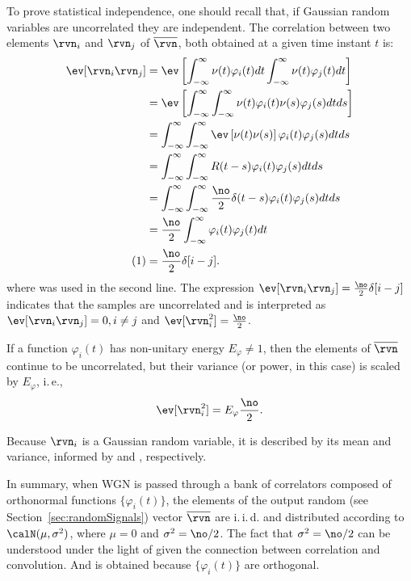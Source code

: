 To prove statistical independence, one should recall that, if Gaussian random variables are uncorrelated they are independent. The correlation between two elements $\rvn_i$ and $\rvn_j$ of $\overline \rvn$, both obtained at a given time instant $t$ is:
\begin{align*}
\ev[\rvn_i \rvn_j] &= \ev \left[ \int_{-\infty}^{\infty}{\nu(t)\varphi_i(t) dt} \int_{-\infty}^{\infty}{\nu(t)\varphi_j(t) dt} \right] \\
 &= \ev \left[ \int_{-\infty}^{\infty}\int_{-\infty}^{\infty}{\nu(t)\varphi_i(t) \nu(s)\varphi_j(s) dt ds} \right] \\
 &= \int_{-\infty}^{\infty}\int_{-\infty}^{\infty} { \ev \left[ \nu(t) \nu(s) \right] \varphi_i(t) \varphi_j(s) dt ds} \\
 &= \int_{-\infty}^{\infty}\int_{-\infty}^{\infty} { R(t-s)  \varphi_i(t) \varphi_j(s) dt ds} \\
 &=  \int_{-\infty}^{\infty}\int_{-\infty}^{\infty} { \frac{\no}{2} \delta(t-s) \varphi_i(t) \varphi_j(s) dt ds} \\
 &=   \frac{\no}{2} \int_{-\infty}^{\infty} {  \varphi_i(t) \varphi_j(t) dt} \\
\stepcounter{equation}\tag{\theequation} \label{eq:uncorrelated} &= \frac{\no}{2} \delta[i-j]. 	
\end{align*}	
where  was used in the second line. The expression
$\ev[\rvn_i \rvn_j] = \frac{\no}{2} \delta[i-j]$ indicates that the samples are uncorrelated and is interpreted as $\ev[\rvn_i \rvn_j] = 0, i \ne j$ and $\ev[\rvn_i^2]=\frac{\no}{2}$. 

If a function $\varphi_i(t)$ has non-unitary energy $E_{\varphi} \ne 1$, then the elements of $\overline \rvn$ continue to be uncorrelated, but their variance (or power, in this case) is scaled by $E_{\varphi}$, i.\,e., 
\begin{equation}
\ev[\rvn_i^2] = E_{\varphi} \frac{\no}{2}.
\label{eq:filteredAWGNNotUnitaryEnergy}
\end{equation}

Because $\rvn_i$ is a Gaussian random variable, it is described by its mean and variance, informed by  and , respectively.

In summary, when WGN is passed through a bank of correlators composed of orthonormal  functions $\{\varphi_i(t)\}$, the elements of the output random (see Section~\ref{sec:randomSignals}) vector $\overline \rvn$ are i.\,i.\,d. and distributed according to $\calN(\mu,\sigma^2)$, where $\mu=0$ and $\sigma^2 = \no/2$. 
The fact that $\sigma^2 = \no/2$ can be understood under the light of  given the connection between correlation and convolution. And  is obtained because $\{\varphi_i(t)\}$ are orthogonal.

